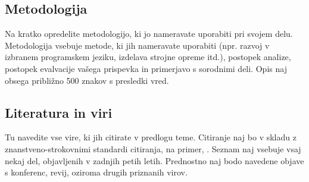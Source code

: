 \documentclass[a4paper, 12pt]{article}
\begin{document}
\subsection{Metodologija}

Na kratko opredelite metodologijo, ki jo nameravate uporabiti pri svojem delu. Metodologija vsebuje metode, ki jih nameravate uporabiti (npr. razvoj v izbranem programskem jeziku, izdelava strojne opreme itd.), postopek analize, postopek evalvacije vašega prispevka in primerjavo s sorodnimi deli. Opis naj obsega približno 500 znakov s presledki vred.


\subsection{Literatura in viri}
\label{literatura}

Tu navedite vse vire, ki jih citirate v predlogu teme. Citiranje naj bo v skladu z znanstveno-strokovnimi standardi citiranja, na primer, \cite{Zivkovic2004}. Seznam naj vsebuje vsaj nekaj del, objavljenih v zadnjih petih letih. Prednostno naj bodo navedene objave s konferenc, revij, oziroma drugih priznanih virov.

\renewcommand\refname{}
\vspace{-50px}




%
\end{document}
